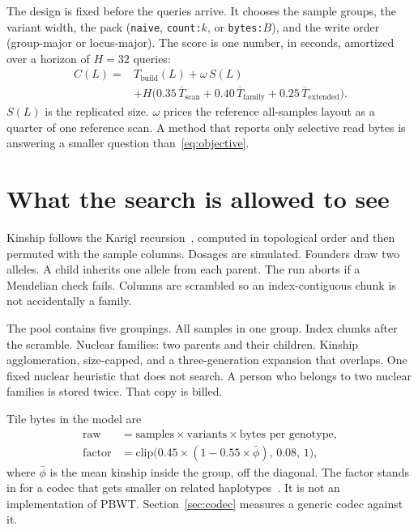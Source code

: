 \documentclass[11pt]{article}
\begin{document}
The design is fixed before the queries arrive.
It chooses the sample groups, the variant width, the pack (\texttt{naive}, \texttt{count:$k$}, or \texttt{bytes:$B$}), and the write order (group-major or locus-major).
The score is one number, in seconds, amortized over a horizon of $H = 32$ queries:
\begin{equation}
\begin{aligned}
C(L) = {} & T_{\mathrm{build}}(L) + \omega \, S(L) \\
       & + H \bigl( 0.35 \, \overline{T}_{\mathrm{scan}}
                  + 0.40 \, \overline{T}_{\mathrm{family}}
                  + 0.25 \, \overline{T}_{\mathrm{extended}} \bigr).
\end{aligned}
\label{eq:objective}
\end{equation}
$S(L)$ is the replicated size.
$\omega$ prices the reference all-samples layout as a quarter of one reference scan.
A method that reports only selective read bytes is answering a smaller question than~\eqref{eq:objective}.

\section{What the search is allowed to see}
\label{sec:method}

Kinship follows the Karigl recursion~\cite{karigl1981}, computed in topological order and then permuted with the sample columns.
Dosages are simulated.
Founders draw two alleles.
A child inherits one allele from each parent.
The run aborts if a Mendelian check fails.
Columns are scrambled so an index-contiguous chunk is not accidentally a family.

The pool contains five groupings.
All samples in one group.
Index chunks after the scramble.
Nuclear families: two parents and their children.
Kinship agglomeration, size-capped, and a three-generation expansion that overlaps.
One fixed nuclear heuristic that does not search.
A person who belongs to two nuclear families is stored twice.
That copy is billed.

Tile bytes in the model are
\begin{equation}
\begin{aligned}
\mathrm{raw} &= \text{samples} \times \text{variants} \times \text{bytes per genotype}, \\
\mathrm{factor} &= \mathrm{clip}\bigl(0.45 \times (1 - 0.55 \times \bar\phi),\, 0.08,\, 1\bigr),
\end{aligned}
\label{eq:factor}
\end{equation}
where $\bar\phi$ is the mean kinship inside the group, off the diagonal.
The factor stands in for a codec that gets smaller on related haplotypes~\cite{durbin2014pbwt}.
It is not an implementation of PBWT.
Section~\ref{sec:codec} measures a generic codec against it.
\end{document}
